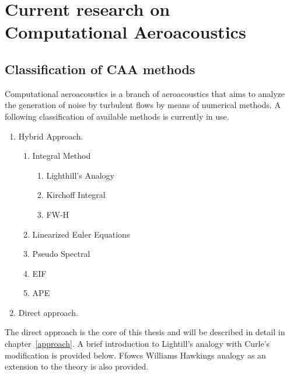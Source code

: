 
\chapter{Current research on Computational Aeroacoustics} %

\label{CAA} %


\section{Classification of CAA methods}
Computational aeroacoustics is a branch of aeroacoustics that aims to analyze the generation of noise by turbulent flows by means of numerical methods. A following classification of available methods is currently in use.

\begin{enumerate}
   \item Hybrid Approach.
   \begin{enumerate}
     \item Integral Method
     \begin{enumerate}
     	\item Lighthill's Analogy
     	\item Kirchoff Integral
     	\item FW-H
     \end{enumerate}
     \item Linearized Euler Equations
     \item Pseudo Spectral
     \item EIF
     \item APE
   \end{enumerate}
   \item Direct approach.
\end{enumerate}

The direct approach is the core of this thesis and will be described in detail in chapter~\ref{approach}. A brief introduction to Lightill's analogy with Curle's modification is provided below. Ffowcs Williams Hawkings analogy as an extension to the theory is also provided.

